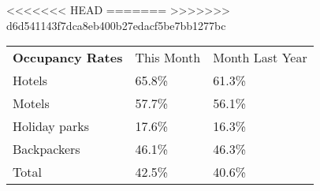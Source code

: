 <<<<<<< HEAD
=======
>>>>>>> d6d541143f7dca8eb400b27edacf5be7bb1277bc
\begin{tabular}[t]{p{4.5cm}>{\hfill}p{1.3cm}>{\hfill}p{1.7cm}}
 \textbf{Occupancy Rates} & This Month & Month Last Year \\ 
 Hotels & 65.8\% & 61.3\% \\ 
  Motels & 57.7\% & 56.1\% \\ 
  Holiday parks & 17.6\% & 16.3\% \\ 
  Backpackers & 46.1\% & 46.3\% \\ 
  Total & 42.5\% & 40.6\% \\ 
  \end{tabular}
